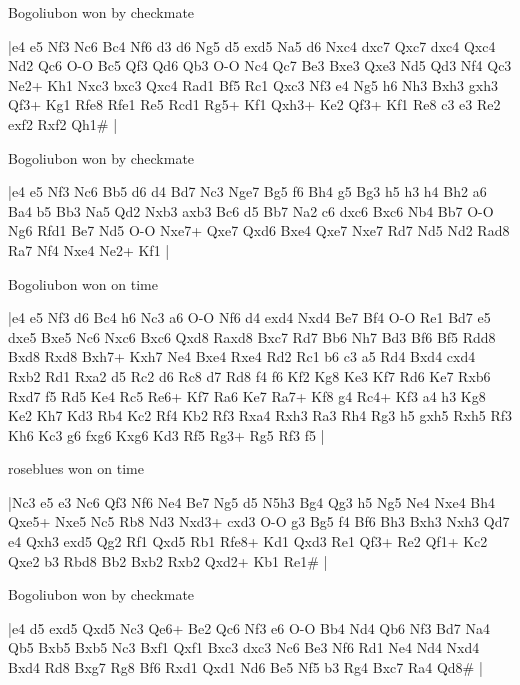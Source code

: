 \showboard

Bogoliubon won by checkmate

\makegametitle
|e4 e5 Nf3 Nc6 Bc4 Nf6 d3 d6 Ng5 d5 exd5 Na5 d6 Nxc4 dxc7 Qxc7 dxc4 Qxc4 Nd2 Qc6 O-O Bc5 Qf3 Qd6 Qb3 O-O Nc4 Qc7 Be3 Bxe3 Qxe3 Nd5 Qd3 Nf4 Qc3 Ne2+ Kh1 Nxc3 bxc3 Qxc4 Rad1 Bf5 Rc1 Qxc3 Nf3 e4 Ng5 h6 Nh3 Bxh3 gxh3 Qf3+ Kg1 Rfe8 Rfe1 Re5 Rcd1 Rg5+ Kf1 Qxh3+ Ke2 Qf3+ Kf1 Re8 c3 e3 Re2 exf2 Rxf2 Qh1\#  |

\showboard

Bogoliubon won by checkmate

\makegametitle
|e4 e5 Nf3 Nc6 Bb5 d6 d4 Bd7 Nc3 Nge7 Bg5 f6 Bh4 g5 Bg3 h5 h3 h4 Bh2 a6 Ba4 b5 Bb3 Na5 Qd2 Nxb3 axb3 Bc6 d5 Bb7 Na2 c6 dxc6 Bxc6 Nb4 Bb7 O-O Ng6 Rfd1 Be7 Nd5 O-O Nxe7+ Qxe7 Qxd6 Bxe4 Qxe7 Nxe7 Rd7 Nd5 Nd2 Rad8 Ra7 Nf4 Nxe4 Ne2+ Kf1  |

\showboard

Bogoliubon won on time

\makegametitle
|e4 e5 Nf3 d6 Bc4 h6 Nc3 a6 O-O Nf6 d4 exd4 Nxd4 Be7 Bf4 O-O Re1 Bd7 e5 dxe5 Bxe5 Nc6 Nxc6 Bxc6 Qxd8 Raxd8 Bxc7 Rd7 Bb6 Nh7 Bd3 Bf6 Bf5 Rdd8 Bxd8 Rxd8 Bxh7+ Kxh7 Ne4 Bxe4 Rxe4 Rd2 Rc1 b6 c3 a5 Rd4 Bxd4 cxd4 Rxb2 Rd1 Rxa2 d5 Rc2 d6 Rc8 d7 Rd8 f4 f6 Kf2 Kg8 Ke3 Kf7 Rd6 Ke7 Rxb6 Rxd7 f5 Rd5 Ke4 Rc5 Re6+ Kf7 Ra6 Ke7 Ra7+ Kf8 g4 Rc4+ Kf3 a4 h3 Kg8 Ke2 Kh7 Kd3 Rb4 Kc2 Rf4 Kb2 Rf3 Rxa4 Rxh3 Ra3 Rh4 Rg3 h5 gxh5 Rxh5 Rf3 Kh6 Kc3 g6 fxg6 Kxg6 Kd3 Rf5 Rg3+ Rg5 Rf3 f5  |

\showboard

roseblues won on time

\makegametitle
|Nc3 e5 e3 Nc6 Qf3 Nf6 Ne4 Be7 Ng5 d5 N5h3 Bg4 Qg3 h5 Ng5 Ne4 Nxe4 Bh4 Qxe5+ Nxe5 Nc5 Rb8 Nd3 Nxd3+ cxd3 O-O g3 Bg5 f4 Bf6 Bh3 Bxh3 Nxh3 Qd7 e4 Qxh3 exd5 Qg2 Rf1 Qxd5 Rb1 Rfe8+ Kd1 Qxd3 Re1 Qf3+ Re2 Qf1+ Kc2 Qxe2 b3 Rbd8 Bb2 Bxb2 Rxb2 Qxd2+ Kb1 Re1\#  |

\showboard

Bogoliubon won by checkmate

\makegametitle
|e4 d5 exd5 Qxd5 Nc3 Qe6+ Be2 Qc6 Nf3 e6 O-O Bb4 Nd4 Qb6 Nf3 Bd7 Na4 Qb5 Bxb5 Bxb5 Nc3 Bxf1 Qxf1 Bxc3 dxc3 Nc6 Be3 Nf6 Rd1 Ne4 Nd4 Nxd4 Bxd4 Rd8 Bxg7 Rg8 Bf6 Rxd1 Qxd1 Nd6 Be5 Nf5 b3 Rg4 Bxc7 Ra4 Qd8\#  |

